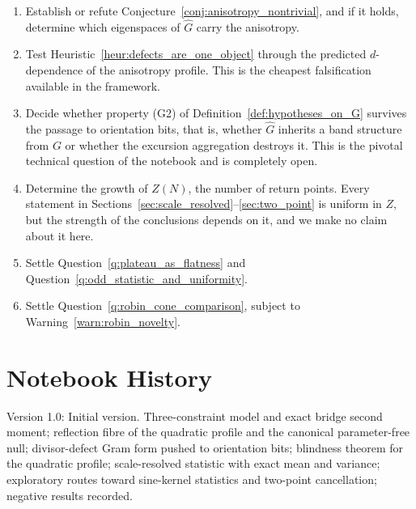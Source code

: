 \documentclass[11pt]{amsart}
\numberwithin{equation}{section}
\theoremstyle{plain}
\theoremstyle{definition}
\theoremstyle{remark}
\begin{document}
\begin{enumerate}[label=(Q\arabic*)]
\item Establish or refute Conjecture~\ref{conj:anisotropy_nontrivial},
and if it holds, determine which eigenspaces of $\widehat{G}$ carry the
anisotropy.
\item Test Heuristic~\ref{heur:defects_are_one_object} through the
predicted $d$-dependence of the anisotropy profile. This is the
cheapest falsification available in the framework.
\item Decide whether property (G2) of
Definition~\ref{def:hypotheses_on_G} survives the passage to
orientation bits, that is, whether $\widehat{G}$ inherits a band
structure from $G$ or whether the excursion aggregation destroys it.
This is the pivotal technical question of the notebook and is
completely open.
\item Determine the growth of $Z(N)$, the number of return points. Every
statement in Sections~\ref{sec:scale_resolved}--\ref{sec:two_point} is
uniform in $Z$, but the strength of the conclusions depends on it, and
we make no claim about it here.
\item Settle Question~\ref{q:plateau_as_flatness} and
Question~\ref{q:odd_statistic_and_uniformity}.
\item Settle Question~\ref{q:robin_cone_comparison}, subject to
Warning~\ref{warn:robin_novelty}.
\end{enumerate}

\section*{Notebook History}
\label{sec:notebook_history}

Version 1.0:
Initial version. Three-constraint model and exact bridge second moment;
reflection fibre of the quadratic profile and the canonical
parameter-free null; divisor-defect Gram form pushed to orientation
bits; blindness theorem for the quadratic profile; scale-resolved
statistic with exact mean and variance; exploratory routes toward
sine-kernel statistics and two-point cancellation; negative results
recorded.
\end{document}
